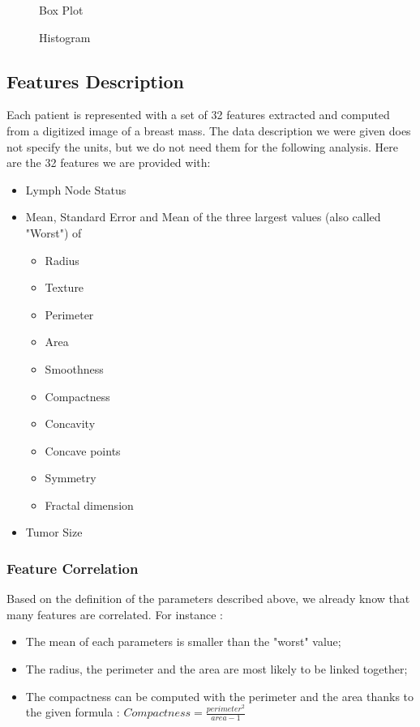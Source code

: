 \documentclass[]{report}
\newcommand{\inputtikz}[2]{%
	\scalebox{#1}{}  
}
\begin{document}
\begin{figure}[!hb]
	\centering
	\inputtikz{0.5}{Figures/time_boxplot.tex}
	\caption{Box Plot}
	\label{fig:time_boxplot}
\end{figure}

\begin{figure}[!h]
	\centering
	\inputtikz{0.5}{Figures/time_hist.tex}
	\caption{Histogram}
	\label{fig:time_hist}
\end{figure}


\subsection{Features Description}
Each patient is represented with a set of 32 features extracted and computed from a digitized image of a breast mass. The data description we were given does not specify the units, but we do not need them for the following analysis. Here are the 32 features we are provided with:  
\begin{itemize}
	\item Lymph Node Status
	
	\item Mean, Standard Error and Mean of the three largest values (also called "Worst") of 
		\begin{itemize}
			\item Radius
			\item Texture
			\item Perimeter
			\item Area
			\item Smoothness
			\item Compactness
			\item Concavity
			\item Concave points
			\item Symmetry
			\item Fractal dimension
		\end{itemize}
	
	\item Tumor Size
\end{itemize}

\subsubsection{Feature Correlation}
Based on the definition of the parameters described above, we already know that many features are correlated. For instance : 
\begin{itemize}
	\item The mean of each parameters is smaller than the "worst" value;
	\item The radius, the perimeter and the area are most likely to be linked together;
	\item The compactness can be computed with the perimeter and the area thanks to the given formula : $Compactness = \frac{perimeter^2}{area - 1}$
\end{itemize}
\end{document}

